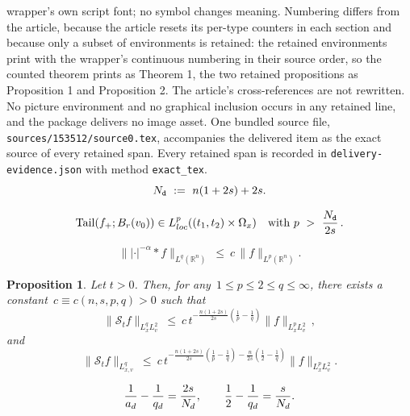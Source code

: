 \documentclass[10pt,a4paper]{amsart}
\theoremstyle{plain}
\newtheorem{prop}{Proposition}
\theoremstyle{remark}
\def\ern{\mathbb{R}^n}
\DeclareMathOperator*{\tail}{{\rm Tail}}
\begin{document}
wrapper's own script font; no symbol changes meaning. Numbering differs from the article, because the article resets its per-type counters in each section and because only a subset of environments is retained: the retained environments print with the wrapper's continuous numbering in their source order, so the counted theorem prints as Theorem 1, the two retained propositions as Proposition 1 and Proposition 2. The article's cross-references are not rewritten. No picture environment and no graphical inclusion occurs in any retained line, and the package delivers no image asset. One bundled source file, \texttt{sources/153512/source0.tex}, accompanies the delivered item as the exact source of every retained span. Every retained span is recorded in \texttt{delivery-evidence.json} with method \texttt{exact\_tex}.
\begin{equation}\label{def:drift-dim}
N_{\tt d} \ := \ n(1+2s) + 2s.
\end{equation}

\begin{equation}\label{HP:tail}
\tail(f_+;B_r(v_0))\in L^{p}_{\rm loc}((t_1,t_2)\times\Omega_x) \quad \text{with}~p \ > \  \frac{N_{\tt d}}{2s}\,.
\end{equation}

\begin{equation}\label{eq:hls-ineq}
\||\cdot|^{-\alpha}\ast f \|_{L^q(\ern)} \ \leq \ c\,\|f\|_{L^p(\ern)}.
\end{equation}

\begin{prop}
\label{sharp:m1:prop_fixed}
Let $t>0$. Then, for any~$1\leq p\leq2\leq q\leq\infty$, there exists a constant~$c\equiv c(n,s,p,q)>0$ such that 
\begin{equation}
\label{sharp:m1:eq_fixed_vector}
\|\mathscr{S}_t f\|_{L^q_xL^2_v} \ \leq \ c\, t^{-\frac{n(1+2s)}{2s}(\frac{1}{p}-\frac{1}{q})}\|f\|_{L^p_xL^2_v}\,,
\end{equation}
and
\begin{equation}
\label{sharp:m1:eq_fixed_scalar}
\|\mathscr{S}_t f\|_{L^q_{x,v}} \ \leq \ c\,t^{-\frac{n(1+2s)}{2s}\left(\frac{1}{p}-\frac{1}{q}\right)
-
\frac{n}{2s}\left(\frac{1}{2}-\frac{1}{q}\right)}
\|f\|_{L^p_xL^2_v}.
\end{equation}
\end{prop}

\begin{equation}\label{sharp:m1:eq_drift_rel}
\frac1{a_{\rm d}}-\frac1{q_{\rm d}}=\frac{2s}{N_{\rm d}},
\qquad
\frac12-\frac1{q_{\rm d}}=\frac{s}{N_{\rm d}}.
\end{equation}
\end{document}
